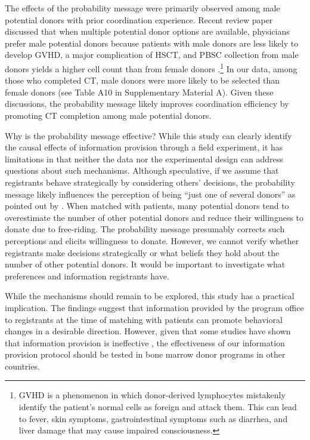 \documentclass[12pt, a4paper]{article}
\begin{document}
The effects of the probability message were primarily observed among male potential donors with prior coordination experience. Recent review paper discussed that when multiple potential donor options are available, physicians prefer male potential donors because patients with male donors are less likely to develop GVHD, a major complication of HSCT, and PBSC collection from male donors yields a higher cell count than from female donors \citep{Fingrut2018}.\footnote{GVHD is a phenomenon in which donor-derived lymphocytes mistakenly identify the patient's normal cells as foreign and attack them. This can lead to fever, skin symptoms, gastrointestinal symptoms such as diarrhea, and liver damage that may cause impaired consciousness.} In our data, among those who completed CT, male donors were more likely to be selected than female donors (see Table A10 in Supplementary Material A). Given these discussions, the probability message likely improves coordination efficiency by promoting CT completion among male potential donors.

Why is the probability message effective? While this study can clearly identify the causal effects of information provision through a field experiment, it has limitations in that neither the data nor the experimental design can address questions about such mechanisms. Although speculative, if we assume that registrants behave strategically by considering others' decisions, the probability message likely influences the perception of being ``just one of several donors'' as pointed out by \citet{Kurosawa2022}. When matched with patients, many potential donors tend to overestimate the number of other potential donors and reduce their willingness to donate due to free-riding. The probability message presumably corrects such perceptions and elicits willingness to donate. However, we cannot verify whether registrants make decisions strategically or what beliefs they hold about the number of other potential donors. It would be important to investigate what preferences and information registrants have.

While the mechanisms should remain to be explored, this study has a practical implication. The findings suggest that information provided by the program office to registrants at the time of matching with patients can promote behavioral changes in a desirable direction. However, given that some studies have shown that information provision is ineffective \citep[e.g.,][]{Switzer2018}, the effectiveness of our information provision protocol should be tested in bone marrow donor programs in other countries.

\clearpage


\end{document}
